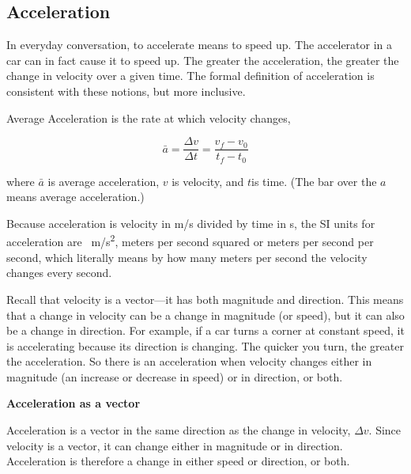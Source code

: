 \documentclass[main-ap-physics.tex]{subfiles}
\begin{document}
\subsection{Acceleration} \label{LgXYss}


In everyday conversation, to accelerate means to speed up. The accelerator in a car can in fact cause it to speed up. The greater the acceleration, the greater the change in velocity over a given time. The formal definition of acceleration is consistent with these notions, but more inclusive.

\begin{mdframed}[backgroundcolor=black!10]
    Average Acceleration is the rate at which velocity changes,

    \begin{equation} \label{vdyjX5}
        \bar{a} = \frac{\Delta v}{\Delta t} = \frac{v_f - v_0}{t_f - t_0} 
    \end{equation}

    where $\bar{a}$ is average acceleration, $v$ is velocity, and $t$is time. (The bar over the $a$ means average acceleration.)
\end{mdframed}

Because acceleration is velocity in m/s divided by time in s, the SI units for acceleration are \SI{}{m/s^2}, meters per second squared or meters per second per second, which literally means by how many meters per second the velocity changes every second.

\vspace{1em}

Recall that velocity is a vector---it has both magnitude and direction. This means that a change in velocity can be a change in magnitude (or speed), but it can also be a change in direction. For example, if a car turns a corner at constant speed, it is accelerating because its direction is changing. The quicker you turn, the greater the acceleration. So there is an acceleration when velocity changes either in magnitude (an increase or decrease in speed) or in direction, or both.

\begin{mdframed}[backgroundcolor=black!10]
    \textbf{Acceleration as a vector}

    \vspace{1ex}

    Acceleration is a vector in the same direction as the change in velocity, $\Delta v$. Since velocity is a vector, it can change either in magnitude or in direction. Acceleration is therefore a change in either speed or direction, or both.
\end{mdframed}
\end{document}
